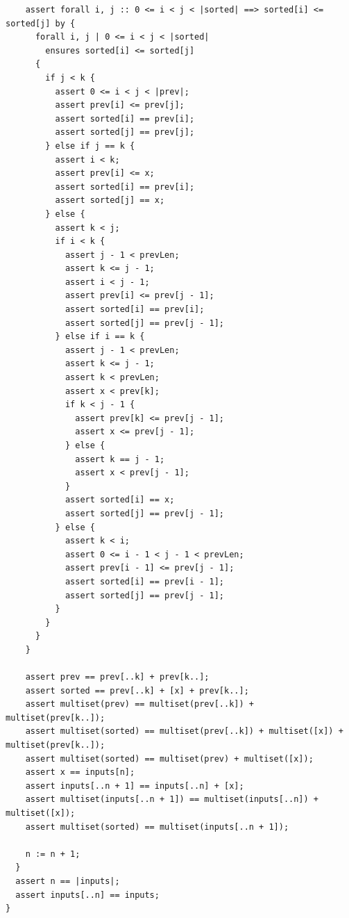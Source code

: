 \documentclass{article}
\begin{document}
\begin{lstlisting}
    assert forall i, j :: 0 <= i < j < |sorted| ==> sorted[i] <= sorted[j] by {
      forall i, j | 0 <= i < j < |sorted|
        ensures sorted[i] <= sorted[j]
      {
        if j < k {
          assert 0 <= i < j < |prev|;
          assert prev[i] <= prev[j];
          assert sorted[i] == prev[i];
          assert sorted[j] == prev[j];
        } else if j == k {
          assert i < k;
          assert prev[i] <= x;
          assert sorted[i] == prev[i];
          assert sorted[j] == x;
        } else {
          assert k < j;
          if i < k {
            assert j - 1 < prevLen;
            assert k <= j - 1;
            assert i < j - 1;
            assert prev[i] <= prev[j - 1];
            assert sorted[i] == prev[i];
            assert sorted[j] == prev[j - 1];
          } else if i == k {
            assert j - 1 < prevLen;
            assert k <= j - 1;
            assert k < prevLen;
            assert x < prev[k];
            if k < j - 1 {
              assert prev[k] <= prev[j - 1];
              assert x <= prev[j - 1];
            } else {
              assert k == j - 1;
              assert x < prev[j - 1];
            }
            assert sorted[i] == x;
            assert sorted[j] == prev[j - 1];
          } else {
            assert k < i;
            assert 0 <= i - 1 < j - 1 < prevLen;
            assert prev[i - 1] <= prev[j - 1];
            assert sorted[i] == prev[i - 1];
            assert sorted[j] == prev[j - 1];
          }
        }
      }
    }

    assert prev == prev[..k] + prev[k..];
    assert sorted == prev[..k] + [x] + prev[k..];
    assert multiset(prev) == multiset(prev[..k]) + multiset(prev[k..]);
    assert multiset(sorted) == multiset(prev[..k]) + multiset([x]) + multiset(prev[k..]);
    assert multiset(sorted) == multiset(prev) + multiset([x]);
    assert x == inputs[n];
    assert inputs[..n + 1] == inputs[..n] + [x];
    assert multiset(inputs[..n + 1]) == multiset(inputs[..n]) + multiset([x]);
    assert multiset(sorted) == multiset(inputs[..n + 1]);

    n := n + 1;
  }
  assert n == |inputs|;
  assert inputs[..n] == inputs;
}
\end{lstlisting}
\end{document}
